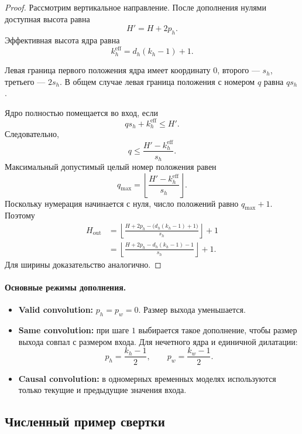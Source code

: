 \documentclass[12pt,a4paper]{article}
\numberwithin{equation}{section}
\theoremstyle{definition}
\theoremstyle{remark}
\begin{document}
\begin{proof}
Рассмотрим вертикальное направление. После дополнения нулями доступная
высота равна
\[
    H'=H+2p_h.
\]
Эффективная высота ядра равна
\[
    k_h^{\mathrm{eff}}=d_h(k_h-1)+1.
\]

Левая граница первого положения ядра имеет координату \(0\), второго
--- \(s_h\), третьего --- \(2s_h\). В общем случае левая граница
положения с номером \(q\) равна \(q s_h\).

Ядро полностью помещается во вход, если
\[
    q s_h+k_h^{\mathrm{eff}}\leq H'.
\]
Следовательно,
\[
    q
    \leq
    \frac{H'-k_h^{\mathrm{eff}}}{s_h}.
\]
Максимальный допустимый целый номер положения равен
\[
    q_{\max}
    =
    \left\lfloor
    \frac{H'-k_h^{\mathrm{eff}}}{s_h}
    \right\rfloor.
\]
Поскольку нумерация начинается с нуля, число положений равно
\(q_{\max}+1\). Поэтому
\[
\begin{split}
    H_{\mathrm{out}}
    &=
    \left\lfloor
    \frac{
        H+2p_h-\bigl(d_h(k_h-1)+1\bigr)
    }{s_h}
    \right\rfloor+1\\
    &=
    \left\lfloor
    \frac{
        H+2p_h-d_h(k_h-1)-1
    }{s_h}
    \right\rfloor+1.
\end{split}
\]
Для ширины доказательство аналогично.
\end{proof}

\paragraph{Основные режимы дополнения.}

\begin{itemize}
    \item \textbf{Valid convolution:} \(p_h=p_w=0\). Размер выхода
    уменьшается.

    \item \textbf{Same convolution:} при шаге \(1\) выбирается такое
    дополнение, чтобы размер выхода совпал с размером входа. Для
    нечетного ядра и единичной дилатации:
    \[
        p_h=\frac{k_h-1}{2},
        \qquad
        p_w=\frac{k_w-1}{2}.
    \]

    \item \textbf{Causal convolution:} в одномерных временных моделях
    используются только текущие и предыдущие значения входа.
\end{itemize}

\subsection{Численный пример свертки}
\end{document}
